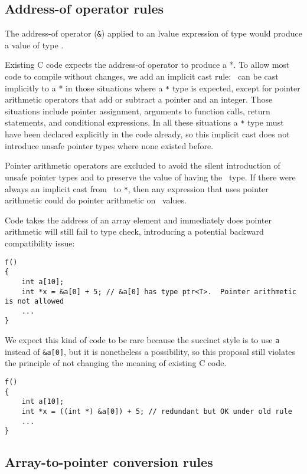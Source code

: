 \subsection{Address-of operator rules}

The address-of operator (\texttt{\&}) applied to an lvalue expression of
type  would produce a value of type
\ptrT.

Existing C code expects the address-of operator to produce a  *.
To allow most code to compile without changes, we add an implicit cast
rule: \ptrT\ can be cast
implicitly to a  * in those situations where a 
\texttt{*} type is expected, except for pointer arithmetic operators
that add or subtract a pointer and an integer. Those situations include
pointer assignment, arguments to function calls, return statements, and
conditional expressions. In all these situations a  \texttt{*}
type must have been declared explicitly in the code already, so this
implicit cast does not introduce unsafe pointer types where none existed
before.

Pointer arithmetic operators are excluded to avoid the silent
introduction of unsafe pointer types and to preserve the value of having
the \ptrT\ type. If
there were always an implicit cast from \ptrT\ to  \texttt{*},
then any expression that uses pointer arithmetic could do pointer
arithmetic on \ptrT\
values.

Code takes the address of an array element and immediately does pointer
arithmetic will still fail to type check, introducing a potential
backward compatibility issue:
\begin{verbatim}
f()
{
    int a[10];
    int *x = &a[0] + 5; // &a[0] has type ptr<T>.  Pointer arithmetic is not allowed
    ...
}
\end{verbatim}

We expect this kind of code to be rare because the succinct style is to
use \texttt{a} instead of \texttt{\&a[0]}, but it is nonetheless a
possibility, so this proposal still violates the principle of not
changing the meaning of existing C code.

\begin{verbatim}
f()
{
    int a[10];
    int *x = ((int *) &a[0]) + 5; // redundant but OK under old rule
    ...
}
\end{verbatim}

\subsection{Array-to-pointer conversion rules}

